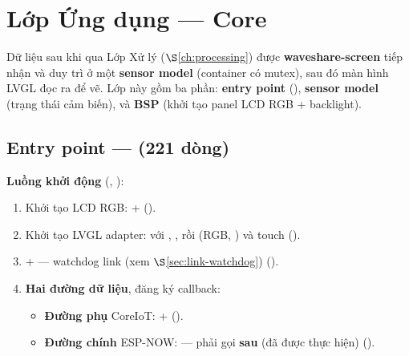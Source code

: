 
\chapter{Lớp Ứng dụng — Core}
\label{ch:application-core}

Dữ liệu sau khi qua Lớp Xử lý ($\S$\ref{ch:processing}) được
\textbf{waveshare-screen} tiếp nhận và duy trì ở một \textbf{sensor model}
(container có mutex), sau đó màn hình LVGL đọc ra để vẽ.  Lớp này gồm ba phần:
\textbf{entry point} (), \textbf{sensor model} (trạng thái cảm biến),
và \textbf{BSP} (khởi tạo panel LCD RGB + backlight).

\section{Entry point —  (221 dòng)}
\label{sec:main-c}

\textbf{Luồng khởi động} (, ):
\begin{enumerate}
\item Khởi tạo LCD RGB:  + 
  ().
\item Khởi tạo LVGL adapter:  với
  , , rồi
   (RGB, ) và touch
  ().
\item {} +  — watchdog link (xem $\S$\ref{sec:link-watchdog})
  ().
\item \textbf{Hai đường dữ liệu}, đăng ký callback:
  \begin{itemize}
  \item \textbf{Đường phụ} CoreIoT:  + 
    ().
  \item \textbf{Đường chính} ESP-NOW: 
    — phải gọi \textbf{sau}  (đã được
     thực hiện) ().
  \end{itemize}
\end{enumerate}


